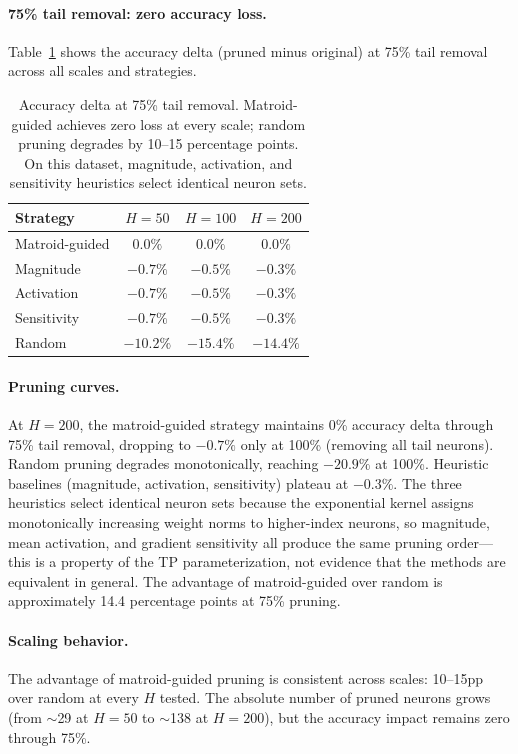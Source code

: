 \documentclass[11pt]{article}
\theoremstyle{definition}
\theoremstyle{remark}
\begin{document}
\paragraph{75\% tail removal: zero accuracy loss.}
Table~\ref{tab:pruning-75} shows the accuracy delta (pruned minus
original) at 75\% tail removal across all scales and strategies.

\begin{table}[t]
  \centering
  \caption{Accuracy delta at 75\% tail removal.  Matroid-guided
    achieves zero loss at every scale; random pruning degrades
    by 10--15 percentage points.  On this dataset, magnitude,
    activation, and sensitivity heuristics select identical neuron
    sets.}
  \label{tab:pruning-75}
  \begin{tabular}{lccc}
    \toprule
    \textbf{Strategy} & $H=50$ & $H=100$ & $H=200$ \\
    \midrule
    Matroid-guided & $0.0\%$ & $0.0\%$ & $0.0\%$ \\
    Magnitude & $-0.7\%$ & $-0.5\%$ & $-0.3\%$ \\
    Activation & $-0.7\%$ & $-0.5\%$ & $-0.3\%$ \\
    Sensitivity & $-0.7\%$ & $-0.5\%$ & $-0.3\%$ \\
    Random & $-10.2\%$ & $-15.4\%$ & $-14.4\%$ \\
    \bottomrule
  \end{tabular}
\end{table}

\paragraph{Pruning curves.}
At $H = 200$, the matroid-guided strategy maintains 0\% accuracy
delta through 75\% tail removal, dropping to $-0.7\%$ only at 100\%
(removing all tail neurons).  Random pruning degrades monotonically,
reaching $-20.9\%$ at 100\%.  Heuristic baselines (magnitude,
activation, sensitivity) plateau at $-0.3\%$.  The three heuristics
select identical neuron sets because the exponential kernel assigns
monotonically increasing weight norms to higher-index neurons, so
magnitude, mean activation, and gradient sensitivity all produce the
same pruning order---this is a property of the TP parameterization,
not evidence that the methods are equivalent in general.
The advantage of matroid-guided over random is approximately 14.4
percentage points at 75\% pruning.

\paragraph{Scaling behavior.}
The advantage of matroid-guided pruning is consistent across scales:
10--15pp over random at every $H$ tested.  The absolute number of
pruned neurons grows (from $\sim$29 at $H = 50$ to $\sim$138 at
$H = 200$), but the accuracy impact remains zero through 75\%.
\end{document}
